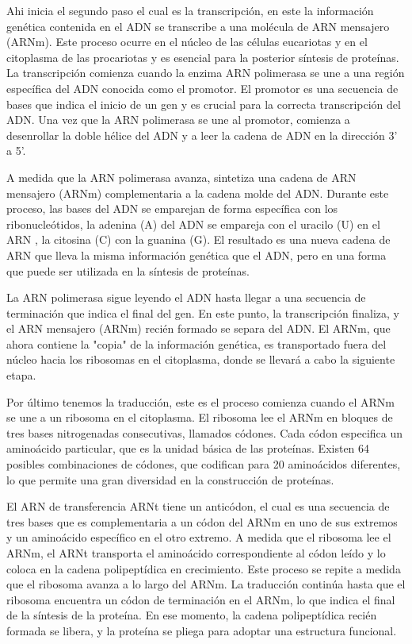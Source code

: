 \documentclass[12pt]{article}
\begin{document}
Ahi inicia el segundo paso el cual es la transcripción, en este la información genética contenida en el ADN se transcribe a una molécula de ARN mensajero (ARNm). Este proceso ocurre en el núcleo de las células eucariotas y en el citoplasma de las procariotas y es esencial para la posterior síntesis de proteínas. La transcripción comienza cuando la enzima ARN polimerasa se une a una región específica del ADN conocida como el promotor. El promotor es una secuencia de bases que indica el inicio de un gen y es crucial para la correcta transcripción del ADN. Una vez que la ARN polimerasa se une al promotor, comienza a desenrollar la doble hélice del ADN y a leer la cadena de ADN en la dirección 3' a 5'.

A medida que la ARN polimerasa avanza, sintetiza una cadena de ARN mensajero (ARNm) complementaria a la cadena molde del ADN. Durante este proceso, las bases del ADN se emparejan de forma específica con los ribonucleótidos, la adenina (A) del ADN se empareja con el uracilo (U) en el ARN , la citosina (C) con la guanina (G). El resultado es una nueva cadena de ARN que lleva la misma información genética que el ADN, pero en una forma que puede ser utilizada en la síntesis de proteínas.

La ARN polimerasa sigue leyendo el ADN hasta llegar a una secuencia de terminación que indica el final del gen. En este punto, la transcripción finaliza, y el ARN mensajero (ARNm) recién formado se separa del ADN. El ARNm, que ahora contiene la "copia" de la información genética, es transportado fuera del núcleo hacia los ribosomas en el citoplasma, donde se llevará a cabo la siguiente etapa.

Por último tenemos la traducción, este es el proceso  comienza cuando el ARNm se une a un ribosoma en el citoplasma. El ribosoma lee el ARNm en bloques de tres bases nitrogenadas consecutivas, llamados códones. Cada códon especifica un aminoácido particular, que es la unidad básica de las proteínas. Existen 64 posibles combinaciones de códones, que codifican para 20 aminoácidos diferentes, lo que permite una gran diversidad en la construcción de proteínas.

El ARN de transferencia ARNt  tiene un anticódon, el cual es una secuencia de tres bases que es complementaria a un códon del ARNm en uno de sus extremos y un aminoácido específico en el otro extremo. A medida que el ribosoma lee el ARNm, el ARNt transporta el aminoácido correspondiente al códon leído y lo coloca en la cadena polipeptídica en crecimiento. Este proceso se repite a medida que el ribosoma avanza a lo largo del ARNm. La traducción continúa hasta que el ribosoma encuentra un códon de terminación en el ARNm, lo que indica el final de la síntesis de la proteína. En ese momento, la cadena polipeptídica recién formada se libera, y la proteína se pliega para adoptar una estructura funcional.






\nocite{*}
\end{document}
